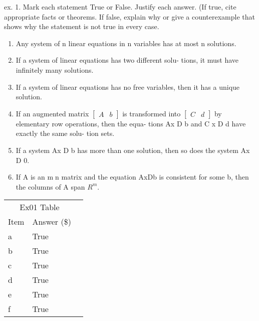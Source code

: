 \documentclass[12pt, letterpaper]{book}
\begin{document}
\newpage
ex. 1. Mark each statement True or False. Justify each answer. (If true, cite appropriate facts or theorems. If false, explain why or give a counterexample that shows why the statement is not true in every case.
\begin{enumerate}[label=(\alph*)]
\item Any system of n linear equations in n variables has at most n solutions.
\item If a system of linear equations has two different solu- tions, it must have infinitely many solutions.
\item If a system of linear equations has no free variables, then it has a unique solution.
\item If an augmented matrix $\begin{bmatrix} A & b \end{bmatrix}$ is transformed into $\begin{bmatrix} C & d \end{bmatrix}$ by elementary row operations, then the equa- tions Ax D b and C x D d have exactly the same solu- tion sets.
\item If a system Ax D b has more than one solution, then so does the system Ax D 0.
\item If A is an m􏰁n matrix and the equation AxDb is consistent for some b, then the columns of A span $R^m$.
\end{enumerate}


\begin{center}
\begin{tabular}{llr}
\hline
\multicolumn{2}{c}{Ex01 Table} \\
\cline{1-2}
Item    & Answer  (\$) \\
\hline
a     & True \\
b     & True \\
c     & True \\
d 	  & True \\
e     & True \\
f     & True \\
\hline
\end{tabular}
\end{center}
\end{document}
